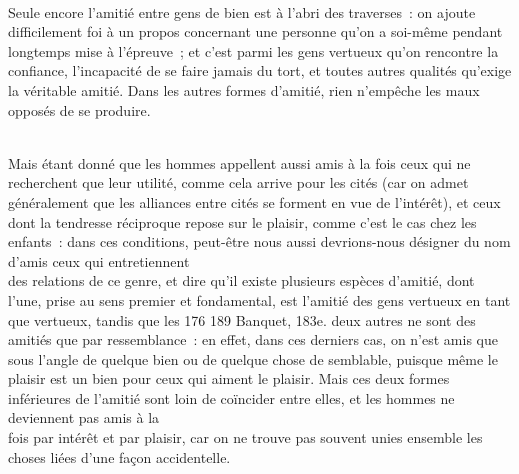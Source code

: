 \documentclass[french,twoside]{book} %
\begin{document}
\\
Seule encore l’amitié entre gens de bien est à l’abri des traverses : on ajoute difficilement foi à un propos concernant une personne qu’on a soi-même pendant longtemps mise à l’épreuve ; et c’est parmi les gens vertueux qu’on rencontre la confiance, l’incapacité de se faire jamais du tort, et toutes autres qualités qu’exige la véritable amitié. Dans les autres formes d’amitié, rien n’empêche les maux opposés de se produire.\par
\\
Mais étant donné que les hommes appellent aussi amis à la fois ceux qui ne recherchent que leur utilité, comme cela arrive pour les cités (car on admet généralement que les alliances entre cités se forment en vue de l’intérêt), et ceux dont la tendresse réciproque repose sur le plaisir, comme c’est le cas chez les enfants : dans ces conditions, peut-être nous aussi devrions-nous désigner du nom d’amis ceux qui entretiennent \\
des relations de ce genre, et dire qu’il existe plusieurs espèces d’amitié, dont l’une, prise au sens premier et fondamental, est l’amitié des gens vertueux en tant que vertueux, tandis que les 176 189 Banquet, 183e. deux autres ne sont des amitiés que par ressemblance : en effet, dans ces derniers cas, on n’est amis que sous l’angle de quelque bien ou de quelque chose de semblable, puisque même le plaisir est un bien pour ceux qui aiment le plaisir. Mais ces deux formes inférieures de l’amitié sont loin de coïncider entre elles, et les hommes ne deviennent pas amis à la \\
fois par intérêt et par plaisir, car on ne trouve pas souvent unies ensemble les choses liées d’une façon accidentelle.
\end{document}
